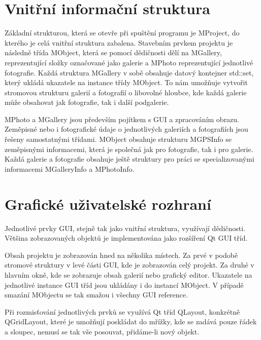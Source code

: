 \documentclass[11pt,twoside,a4paper]{book}
\begin{document}
\section{Vnitřní informační struktura}
\noindent
Základní strukturou, která se otevře při spuštění programu je MProject, do kterého je celá vnitřní struktura zabalena. Stavebním prvkem projektu je následně třída MObject, která se pomocí dědičnosti dělí na MGallery, reprezentující složky označované jako galerie a MPhoto reprezentující jednotlivé fotografie. Každá struktura MGallery v sobě obsahuje datový kontejner std::set\cite{stl}, který ukládá ukazatele na instance třídy MObject. To nám umožňuje vytvořit stromovou strukturu galerií a fotografií o libovolné hloubce, kde každá galerie může obsahovat jak fotografie, tak i další podgalerie.

\indent
MPhoto a MGallery jsou především pojítkem s GUI a zpracováním obrazu. Zeměpisné nebo i fotografické údaje o jednotlivých galeriích a fotografiích jsou řešeny samostatnými třídami. MObject obsahuje strukturu MGPSInfo se zeměpisnými informacemi, která je společná jak pro fotografie, tak i pro galerie. Každá galerie a fotografie obsahuje ještě struktury pro práci se specializovanými informacemi MGalleryInfo a MPhotoInfo.

\section{Grafické uživatelské rozhraní}
\noindent
Jednotlivé prvky GUI, stejně tak jako vnitřní struktura, využívají dědičnosti. Většina zobrazovaných objektů je implementována jako rozšíření Qt GUI tříd.

\indent
Obsah projektu je zobrazován hned na několika místech. Za prvé v podobě stromové struktury v levé části GUI, kde je zobrazován celý projekt. Za druhé v hlavním okně, kde se zobrazuje obsah galerií nebo grafický editor. Ukazatele na jednotlivé instance GUI tříd jsou ukládány i do instancí MObject. V případě smazání MObjectu se tak smažou i všechny GUI reference.

\indent
Při rozmisťování jednotlivých prvků se využívá Qt tříd QLayout, konkrétně QGridLayout, které je umožňují poskládat do mřížky, kde se zadává pouze řádek a sloupec, nemusí se tak vše posouvat, přidáme-li nový objekt.
\end{document}
